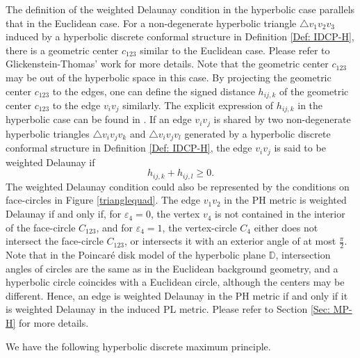\documentclass[12pt]{amsart}
\theoremstyle{definition}
\begin{document}
The definition of the weighted Delaunay condition in the hyperbolic case parallels that in the Euclidean case.
For a non-degenerate hyperbolic triangle $\triangle v_1v_2v_3$ induced by a hyperbolic discrete conformal structure in Definition \ref{Def: IDCP-H}, there is a geometric center $c_{123}$ similar to the Euclidean case. Please refer to Glickenstein-Thomas' work \cite{G-T} for more details. Note that the geometric center $c_{123}$ may be out of the hyperbolic space in this case.
By projecting the geometric center $c_{123}$ to the edges, one can define the signed distance $h_{ij,k}$ of the geometric center $c_{123}$
to the edge $v_iv_j$ similarly. The explicit expression of $h_{ij,k}$ in the hyperbolic case can be found in \cite{G-T,Xu MRL,Xu 1}.
If an edge $v_iv_j$ is shared by two non-degenerate hyperbolic triangles $\triangle v_iv_jv_k$ and $\triangle v_iv_jv_l$ generated by a hyperbolic discrete conformal structure in Definition \ref{Def: IDCP-H}, the edge $v_iv_j$ is said to be weighted Delaunay if
$$h_{ij,k}+h_{ij,l}\geq0.$$
The weighted Delaunay condition could also be represented by the conditions on face-circles in Figure \ref{trianglequad}.
The edge $v_1v_2$ in the PH metric is weighted Delaunay if and only if, for $\varepsilon_4=0$, the vertex $v_4$ is not contained in the interior of the face-circle $C_{123}$, and for $\varepsilon_4=1$, the vertex-circle $C_4$ either does not intersect the face-circle $C_{123}$, or intersects it with an exterior angle of at most $\frac{\pi}{2}$.
Note that in the Poincar\'{e} disk model of the hyperbolic plane $\mathbb{D}$, intersection angles of circles are the same as in the Euclidean background geometry, and
a hyperbolic circle coincides with a Euclidean circle, although the centers may be different.
Hence, an edge is weighted Delaunay in the PH metric if and only if it is weighted Delaunay in the induced PL metric.
Please refer to Section \ref{Sec: MP-H} for more details.


We have the following hyperbolic discrete maximum principle. 
\end{document}
